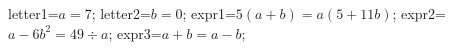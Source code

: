 \documentclass[exercice]{thedocument}%
\begin{document}
%
\>letter1=$a=7$;%
\>letter2=$b=0$;%
\>expr1=$5(a+b)=a(5+11b)$;%
\>expr2=$a-6b^2=49\div a$;%
\>expr3=$a+b=a-b$;%
%
\end{document}
